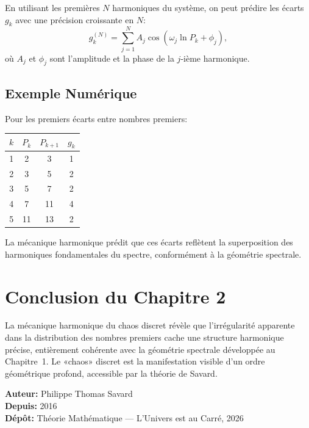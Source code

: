 \documentclass[12pt,a4paper]{article}
\begin{document}
En utilisant les premières $N$ harmoniques du système, on peut prédire les écarts
$g_k$ avec une précision croissante en $N$:
\[
  g_k^{(N)} = \sum_{j=1}^{N} A_j \cos(\omega_j \ln P_k + \phi_j),
\]
où $A_j$ et $\phi_j$ sont l'amplitude et la phase de la $j$-ième harmonique.

\subsection{Exemple Numérique}

Pour les premiers écarts entre nombres premiers:
\begin{center}
\begin{tabular}{c|c|c|c}
  $k$ & $P_k$ & $P_{k+1}$ & $g_k$ \\\hline
  1 & 2 & 3 & 1 \\
  2 & 3 & 5 & 2 \\
  3 & 5 & 7 & 2 \\
  4 & 7 & 11 & 4 \\
  5 & 11 & 13 & 2 \\
\end{tabular}
\end{center}

La mécanique harmonique prédit que ces écarts reflètent la superposition des
harmoniques fondamentales du spectre, conformément à la géométrie spectrale.

\section{Conclusion du Chapitre 2}

La mécanique harmonique du chaos discret révèle que l'irrégularité apparente dans
la distribution des nombres premiers cache une structure harmonique précise, entièrement
cohérente avec la géométrie spectrale développée au Chapitre~1. Le «chaos» discret
est la manifestation visible d'un ordre géométrique profond, accessible par la
théorie de Savard.

\bigskip
\noindent\textbf{Auteur:} Philippe Thomas Savard\\
\noindent\textbf{Depuis:} 2016\\
\noindent\textbf{Dépôt:} Théorie Mathématique — L'Univers est au Carré, 2026
\end{document}
